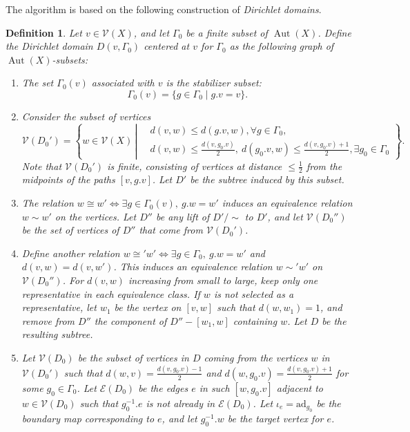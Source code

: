 \documentclass[12pt,leqno]{amsart}
\newcommand{\2}{L^2_{\rm per}(0, T)}
\newtheorem{defn}{Definition}[section]
\newcommand{\aut}{{\operatorname{Aut}}}
\numberwithin{equation}{section}
\numberwithin{figure}{section}
\begin{document}
The algorithm is based on the following construction of \emph{Dirichlet domains}.
\begin{defn}
    Let $v\in \mathcal{V}(X)$, and let $\Gamma_0$ be a finite subset of $\aut(X)$. Define the \emph{Dirichlet domain} $D(v,\Gamma_0)$ centered at $v$ for $\Gamma_0$ as the following graph of $\aut(X)$-subsets:
    \begin{enumerate}
        \item The set $\Gamma_0(v)$ associated with $v$ is the stabilizer subset:
        \[
        \Gamma_0(v) = \{g\in\Gamma_0\mid g.v = v\}.
        \]
        \item Consider the subset of vertices
        \[
        \mathcal{V}(D_0') = \left\{w\in\mathcal{V}(X)\,\left|\,\begin{aligned}
            & d(v,w)\leq d(g.v,w),\forall g\in\Gamma_0,\\
            & d(v,w)\leq \frac{d(v,g_0.v)}{2},\ d(g_0.v,w)\leq \frac{d(v,g_0.v)+1}{2},\exists g_0\in \Gamma_0
        \end{aligned}\right.\right\}.
        \]
        Note that $\mathcal{V}(D_0')$ is finite, consisting of vertices at distance $\leq \frac{1}{2}$ from the midpoints of the paths $[v,g.v]$. Let $D'$ be the subtree induced by this subset.
        \item The relation $w\cong w'\iff \exists g\in \Gamma_0(v),\ g.w = w'$ induces an equivalence relation $w\sim w'$ on the vertices. Let $D''$ be any lift of $D'/\sim$ to $D'$, and let $\mathcal{V}(D_0'')$ be the set of vertices of $D''$ that come from $\mathcal{V}(D_0')$.
        \item Define another relation $w\cong' w'\iff \exists g\in \Gamma_0,\ g.w = w'$ and $d(v,w) = d(v,w')$. This induces an equivalence relation $w\sim' w'$ on $\mathcal{V}(D_0'')$. For $d(v,w)$ increasing from small to large, keep only one representative in each equivalence class. If $w$ is not selected as a representative, let $w_1$ be the vertex on $[v,w]$ such that $d(w,w_1) = 1$, and remove from $D''$ the component of $D'' - [w_1,w]$ containing $w$. Let $D$ be the resulting subtree.
        \item Let $\mathcal{V}(D_0)$ be the subset of vertices in $D$ coming from the vertices $w$ in $\mathcal{V}(D_0')$ such that $d(w,v) = \frac{d(v,g_0.v)-1}{2}$ and $d(w,g_0.v) = \frac{d(v,g_0.v)+1}{2}$ for some $g_0\in\Gamma_0$. Let $\mathcal{E}(D_0)$ be the edges $e$ in such $[w,g_0.v]$ adjacent to $w\in \mathcal{V}(D_0)$ such that $g_0^{-1}.e$ is not already in $\mathcal{E}(D_0)$. Let $\iota_e = \mathrm{ad}_{g_0}$ be the boundary map corresponding to $e$, and let $g_0^{-1}.w$ be the target vertex for $e$.

\end{enumerate}
\end{defn}
\end{document}
